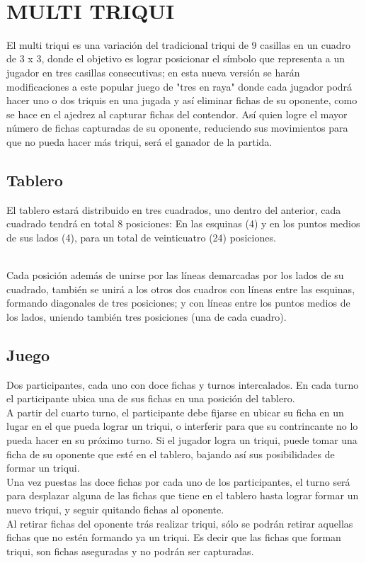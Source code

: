 ﻿﻿\documentclass{article}
\begin{document}
\section{MULTI TRIQUI} \label{Contenido}

El multi triqui es una variación del tradicional triqui de 9 casillas en un cuadro de 3 x 3, donde el objetivo es lograr posicionar el símbolo que representa a un jugador en tres casillas consecutivas; en esta nueva versión se harán modificaciones a este popular juego de "tres en raya" donde cada jugador podrá hacer uno o dos triquis en una jugada y así eliminar fichas de su oponente, como se hace en el ajedrez al capturar fichas del contendor. Así quien logre el mayor número de fichas capturadas de su oponente, reduciendo sus movimientos para que no pueda hacer más triqui, será el ganador de la partida.

\subsection {Tablero}

El tablero estará distribuido en tres cuadrados, uno dentro del anterior, cada cuadrado tendrá en total 8 posiciones: En las esquinas (4) y en los puntos medios de sus lados (4), para un total de veinticuatro (24) posiciones. \\\

Cada posición además de unirse por las líneas demarcadas por los lados de su cuadrado, también se unirá a los otros dos cuadros con líneas entre las esquinas, formando diagonales de tres posiciones; y con líneas entre los puntos medios de los lados, uniendo también tres posiciones (una de cada cuadro).

\subsection {Juego}

Dos participantes, cada uno con doce fichas y turnos intercalados.
En cada turno el participante ubica una de sus fichas en una posición del tablero.\\
A partir del cuarto turno, el participante debe fijarse en ubicar su ficha en un lugar en el que pueda lograr un triqui, o interferir para que su contrincante no lo pueda hacer en su próximo turno.
Si el jugador logra un triqui, puede tomar una ficha de su oponente que esté en el tablero, bajando así sus posibilidades de formar un triqui.\\
Una vez puestas las doce fichas por cada uno de los participantes, el turno será para desplazar alguna de las fichas que tiene en el tablero hasta lograr formar un nuevo triqui, y seguir quitando fichas al oponente.\\
Al retirar fichas del oponente trás realizar triqui, sólo se podrán retirar aquellas fichas que no estén formando ya un triqui. Es decir que las fichas que forman triqui, son fichas aseguradas y no podrán ser capturadas.
\end{document}
